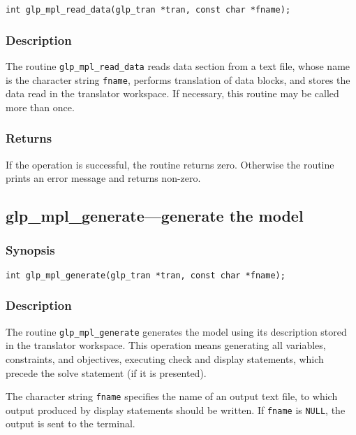\begin{verbatim}
int glp_mpl_read_data(glp_tran *tran, const char *fname);
\end{verbatim}

\subsubsection*{Description}

The routine \verb|glp_mpl_read_data| reads data section from a text
file, whose name is the character string \verb|fname|, performs
translation of data blocks, and stores the data read in the translator
workspace. If necessary, this routine may be called more than once.

\subsubsection*{Returns}

If the operation is successful, the routine returns zero. Otherwise
the routine prints an error message and returns non-zero.

\subsection{glp\_mpl\_generate---generate the model}

\subsubsection*{Synopsis}

\begin{verbatim}
int glp_mpl_generate(glp_tran *tran, const char *fname);
\end{verbatim}

\subsubsection*{Description}

The routine \verb|glp_mpl_generate| generates the model using its
description stored in the translator workspace. This operation means
generating all variables, constraints, and objectives, executing check
and display statements, which precede the solve statement (if it is
presented).

The character string \verb|fname| specifies the name of an output text
file, to which output produced by display statements should be written.
If \verb|fname| is \verb|NULL|, the output is sent to the terminal.

